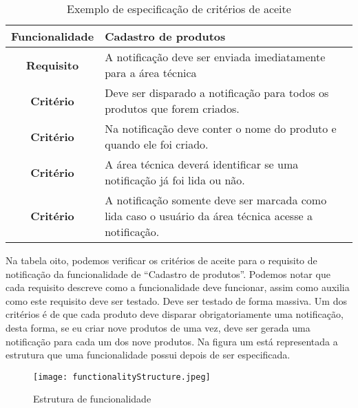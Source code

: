       \begin{table}[h!]
        \centering
        \begin{tabular}{|c|p{10cm}|}
          \hline
          \textbf{Funcionalidade} &
          Cadastro de produtos \\ \hline
          \textbf{Requisito} &
          A notificação deve ser enviada imediatamente para a área técnica \\ \hline
          \textbf{Critério} &
          Deve ser disparado a notificação para todos os produtos que forem criados. \\ \hline
          \textbf{Critério} &
          Na notificação deve conter o nome do produto e quando ele foi criado. \\ \hline
          \textbf{Critério} &
          A área técnica deverá identificar se uma notificação já foi lida ou não. \\ \hline
          \textbf{Critério} &
          A notificação somente deve ser marcada como lida caso o usuário da área
          técnica acesse a notificação. \\ \hline
        \end{tabular}
        \caption{Exemplo de especificação de critérios de aceite}
        \label{Tabela:8}
      \end{table}

      Na tabela oito, podemos verificar os critérios de aceite para o requisito de
      notificação da funcionalidade de “Cadastro de produtos”. Podemos notar que cada
      requisito descreve como a funcionalidade deve funcionar, assim como auxilia
      como este requisito deve ser testado. Deve ser testado de forma massiva.
      Um dos critérios é de que cada produto deve disparar obrigatoriamente uma
      notificação, desta forma, se eu criar nove produtos de uma vez, deve ser
      gerada uma notificação para cada um dos nove produtos. Na figura um está
      representada a estrutura que uma funcionalidade possui depois de ser
      especificada. \newline

      \begin{figure}[!h]
        \centering
        \texttt{[image: functionalityStructure.jpeg]}
        \caption{Estrutura de funcionalidade}
        \label{Imagem:1}
      \end{figure}


